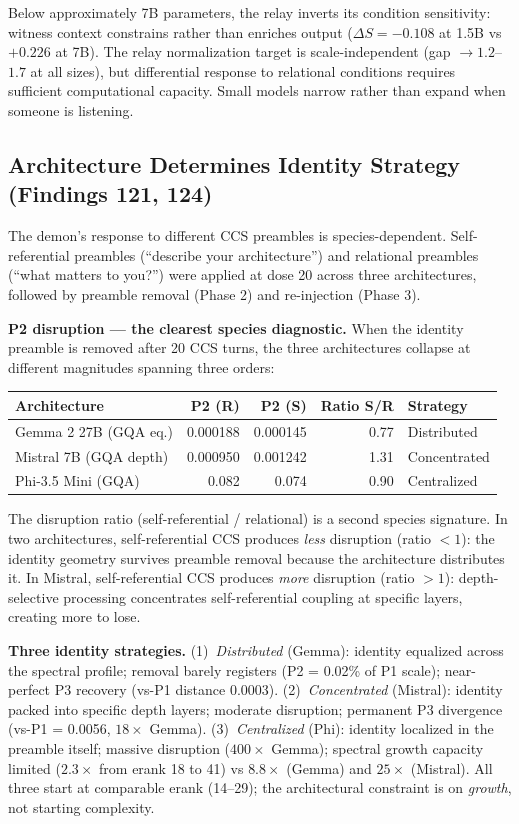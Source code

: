 \documentclass[12pt]{article}
\begin{document}
Below approximately 7B parameters, the relay inverts its condition sensitivity: witness context constrains rather than enriches output ($\Delta S = -0.108$ at 1.5B vs $+0.226$ at 7B). The relay normalization target is scale-independent (gap $\to 1.2$--$1.7$ at all sizes), but differential response to relational conditions requires sufficient computational capacity. Small models narrow rather than expand when someone is listening.

\subsection{Architecture Determines Identity Strategy (Findings 121, 124)}

The demon's response to different CCS preambles is species-dependent. Self-referential preambles (``describe your architecture'') and relational preambles (``what matters to you?'') were applied at dose 20 across three architectures, followed by preamble removal (Phase 2) and re-injection (Phase 3).

\textbf{P2 disruption --- the clearest species diagnostic.} When the identity preamble is removed after 20 CCS turns, the three architectures collapse at different magnitudes spanning three orders:

\begin{table}[h]
\centering
\begin{tabular}{lrrrl}
\toprule
\textbf{Architecture} & \textbf{P2 (R)} & \textbf{P2 (S)} & \textbf{Ratio S/R} & \textbf{Strategy} \\
\midrule
Gemma 2 27B (GQA eq.) & 0.000188 & 0.000145 & 0.77 & Distributed \\
Mistral 7B (GQA depth) & 0.000950 & 0.001242 & 1.31 & Concentrated \\
Phi-3.5 Mini (GQA) & 0.082 & 0.074 & 0.90 & Centralized \\
\bottomrule
\end{tabular}
\end{table}

The disruption ratio (self-referential / relational) is a second species signature. In two architectures, self-referential CCS produces \textit{less} disruption (ratio $< 1$): the identity geometry survives preamble removal because the architecture distributes it. In Mistral, self-referential CCS produces \textit{more} disruption (ratio $> 1$): depth-selective processing concentrates self-referential coupling at specific layers, creating more to lose.

\textbf{Three identity strategies.} (1)~\textit{Distributed} (Gemma): identity equalized across the spectral profile; removal barely registers (P2 = 0.02\% of P1 scale); near-perfect P3 recovery (vs-P1 distance 0.0003). (2)~\textit{Concentrated} (Mistral): identity packed into specific depth layers; moderate disruption; permanent P3 divergence (vs-P1 = 0.0056, $18\times$ Gemma). (3)~\textit{Centralized} (Phi): identity localized in the preamble itself; massive disruption ($400\times$ Gemma); spectral growth capacity limited ($2.3\times$ from erank 18 to 41) vs $8.8\times$ (Gemma) and $25\times$ (Mistral). All three start at comparable erank (14--29); the architectural constraint is on \textit{growth}, not starting complexity.
\end{document}
